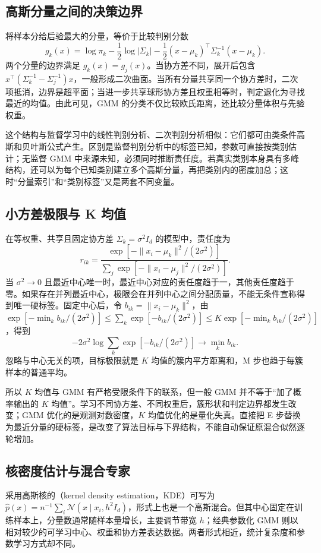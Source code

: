 \documentclass[UTF8]{ctexart}
\begin{document}
\subsection{高斯分量之间的决策边界}
将样本分给后验最大的分量，等价于比较判别分数
\[
g_k(x)=\log\pi_k-\frac12\log|\Sigma_k|
-\frac12(x-\mu_k)^\top\Sigma_k^{-1}(x-\mu_k).
\]
两个分量的边界满足 $g_k(x)=g_j(x)$。当协方差不同，展开后包含 $x^\top(\Sigma_k^{-1}-\Sigma_j^{-1})x$，一般形成二次曲面。当所有分量共享同一个协方差时，二次项抵消，边界是超平面；当进一步共享球形协方差且权重相等时，判定退化为寻找最近的均值。由此可见，GMM 的分类不仅比较欧氏距离，还比较分量体积与先验权重。

这个结构与监督学习中的线性判别分析、二次判别分析相似：它们都可由类条件高斯和贝叶斯公式产生。区别是监督判别分析中的标签已知，参数可直接按类别估计；无监督 GMM 中来源未知，必须同时推断责任度。若真实类别本身具有多峰结构，还可以为每个已知类别建立多个高斯分量，再把类别内的密度加总；这时“分量索引”和“类别标签”又是两套不同变量。

\subsection{小方差极限与 K 均值}
在等权重、共享且固定协方差 $\Sigma_k=\sigma^2I_d$ 的模型中，责任度为
\[
r_{ik}=\frac{\exp[-\|x_i-\mu_k\|^2/(2\sigma^2)]}
{\sum_j\exp[-\|x_i-\mu_j\|^2/(2\sigma^2)]}.
\]
当 $\sigma^2\to0$ 且最近中心唯一时，最近中心对应的责任度趋于一，其他责任度趋于零。如果存在并列最近中心，极限会在并列中心之间分配质量，不能无条件宣称得到唯一硬标签。固定中心后，令 $b_{ik}=\|x_i-\mu_k\|^2$，由
$\exp[-\min_kb_{ik}/(2\sigma^2)]\leq\sum_k\exp[-b_{ik}/(2\sigma^2)]\leq K\exp[-\min_kb_{ik}/(2\sigma^2)]$，得到
\begin{equation}
-2\sigma^2\log\sum_k\exp[-b_{ik}/(2\sigma^2)]
\longrightarrow\min_k b_{ik}.
\label{eq:gmm-kmeans-limit}
\end{equation}
忽略与中心无关的项，目标极限就是 $K$ 均值的簇内平方距离和，M 步也趋于每簇样本的普通平均。

所以 $K$ 均值与 GMM 有严格受限条件下的联系，但一般 GMM 并不等于“加了概率输出的 $K$ 均值”。学习不同协方差、不同权重后，簇形状和判定边界都发生改变；GMM 优化的是观测对数密度，$K$ 均值优化的是量化失真。直接把 E 步替换为最近分量的硬标签，是改变了算法目标与下界结构，不能自动保证原混合似然逐轮增加。

\subsection{核密度估计与混合专家}
采用高斯核的（kernel density estimation，KDE）可写为 $\widehat p(x)=n^{-1}\sum_i\mathcal N(x\mid x_i,h^2I_d)$，形式上也是一个高斯混合。但其中心固定在训练样本上，分量数通常随样本量增长，主要调节带宽 $h$；经典参数化 GMM 则以相对较少的可学习中心、权重和协方差表达数据。两者形式相近，统计复杂度和参数学习方式却不同。
\end{document}
